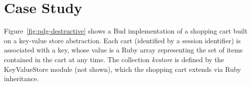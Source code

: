\section{Case Study}
\label{sec:case}

Figure~\ref{fig:pdg-destructive} shows a Bud implementation of a shopping
cart built on a key-value store abstraction.  Each cart (identified by a
session identifier) is associated with a key, whose value is a Ruby array
representing the set of items contained in the cart at any time.  The 
collection \emph{kvstore} is defined by the KeyValueStore module (not shown), 
which the shopping cart extends via Ruby inheritance.  

